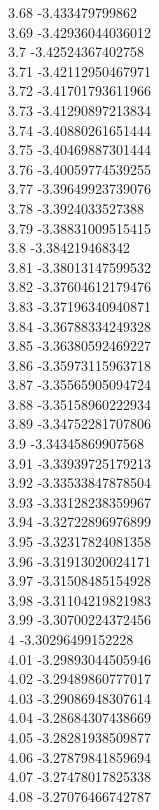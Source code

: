 {3.68	-3.433479799862\\
3.69	-3.42936044036012\\
3.7	-3.42524367402758\\
3.71	-3.42112950467971\\
3.72	-3.41701793611966\\
3.73	-3.41290897213834\\
3.74	-3.40880261651444\\
3.75	-3.40469887301444\\
3.76	-3.40059774539255\\
3.77	-3.39649923739076\\
3.78	-3.3924033527388\\
3.79	-3.38831009515415\\
3.8	-3.384219468342\\
3.81	-3.38013147599532\\
3.82	-3.37604612179476\\
3.83	-3.37196340940871\\
3.84	-3.36788334249328\\
3.85	-3.36380592469227\\
3.86	-3.35973115963718\\
3.87	-3.35565905094724\\
3.88	-3.35158960222934\\
3.89	-3.34752281707806\\
3.9	-3.34345869907568\\
3.91	-3.33939725179213\\
3.92	-3.33533847878504\\
3.93	-3.33128238359967\\
3.94	-3.32722896976899\\
3.95	-3.32317824081358\\
3.96	-3.31913020024171\\
3.97	-3.31508485154928\\
3.98	-3.31104219821983\\
3.99	-3.30700224372456\\
4	-3.30296499152228\\
4.01	-3.29893044505946\\
4.02	-3.29489860777017\\
4.03	-3.29086948307614\\
4.04	-3.28684307438669\\
4.05	-3.28281938509877\\
4.06	-3.27879841859694\\
4.07	-3.27478017825338\\
4.08	-3.27076466742787\\
}
